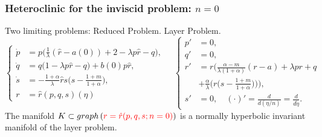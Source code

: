 \documentclass{beamer}
\def\red{\color{red}}
\def\blue{\color{blue}}
\begin{document}
\begin{frame}
 \frametitle{Heteroclinic for the inviscid problem: $n=0$}
 Two limiting problems:
   \vfill
  {\footnotesize
    \hspace{3em} {Reduced Problem.} \hspace{12em} Layer Problem.
\begin{equation*} %
 \left\{
 \begin{aligned}
 \dot{p} &=p\Big(\frac{1}{\lambda}(\hat{r}-a(0)) + 2- \lambda p \hat{r} -q\Big),\\
 \dot{q} &=q\Big(1 -\lambda p \hat{r} -q\Big) + b(0) p \hat{r},\\
 \dot{s} &=- \frac{1+\alpha}{\lambda}\hat{r}s\big(s- \frac{1+m}{1+\alpha}\big),\\
 r&=\hat{r}(p,q,s)(\eta)
 \end{aligned}\right.
 \quad  
 \left\{
 \begin{aligned}
 {p}' &=0,\\
 {q}' &=0,\\
 {r}' &=r\Big(\frac{\alpha-m}{\lambda(1+\alpha)}(r-a) + \lambda pr + q \\
 &+\frac{\alpha}{\lambda}\Big(r\big(s- \frac{1+m}{1+\alpha}\big)\Big)\Big),\\
 {s}' &=0, \quad (\cdot)' = \frac{d}{d(\eta/n)} = \frac{d}{d\tilde\eta}.
 \end{aligned}\right.
\end{equation*}
}
The manifold $K\subset graph\left({\red r=\hat{r}(p,q,s;n=0)}\right)$ is a normally hyperbolic invariant manifold of the layer problem.
 

\end{frame}


\end{document}
